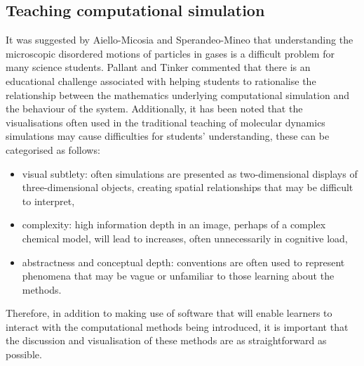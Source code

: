 \subsection{Teaching computational simulation}
It was suggested by Aiello-Micosia and Sperandeo-Mineo\autocite{aiello-nicosia_computer_1985} that understanding the microscopic disordered motions of particles in gases is a difficult problem for many science students.
Pallant and Tinker\autocite{pallant_reasoning_2004} commented that there is an educational challenge associated with helping students to rationalise the relationship between the mathematics underlying computational simulation and the behaviour of the system.
Additionally, it has been noted that the visualisations often used in the traditional teaching of molecular dynamics simulations may cause difficulties for students' understanding, these can be categorised as follows:\autocite{jones_molecular_2005}
\begin{itemize}
\item visual subtlety: often simulations are presented as two-dimensional displays of three-dimensional objects, creating spatial relationships that may be difficult to interpret,
\item complexity: high information depth in an image, perhaps of a complex chemical model, will lead to increases, often unnecessarily in cognitive load,
\item abstractness and conceptual depth: conventions are often used to represent phenomena that may be vague or unfamiliar to those learning about the methods.
\end{itemize}
Therefore, in addition to making use of software that will enable learners to interact with the computational methods being introduced, it is important that the discussion and visualisation of these methods are as straightforward as possible.

